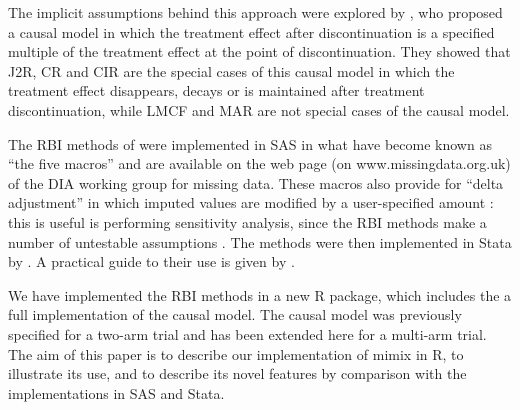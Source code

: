 The implicit assumptions behind this approach were explored by \citet{ian:RBIcausal}, who proposed a causal model in which the treatment effect after discontinuation is a specified multiple of the treatment effect at the point of discontinuation. They showed that J2R, CR and CIR are the special cases of this causal model in which the treatment effect disappears, decays or is maintained after treatment discontinuation, while LMCF and MAR are not special cases of the causal model. 

The RBI methods of \citet{Carpenter++13} were implemented in SAS in what have become known as ``the five macros'' and are available on the web page (on www.missingdata.org.uk) of the DIA working group for missing data. These macros also provide for ``delta adjustment'' in which imputed values are modified by a user-specified amount \citep{Ratitch++13}: this is useful is performing sensitivity analysis, since the RBI methods make a number of untestable assumptions \citep{ian:ZAMSTAR}.
The methods were then implemented in Stata by \citet{Cro++16}.
A practical guide to their use is given by \citet{Cro++20}.

We have implemented the RBI methods in a new R package, which includes the a full implementation of the causal model. 
The causal model was previously specified for a two-arm trial and has been extended here for a multi-arm trial.
The aim of this paper is to describe our implementation of mimix in R, to illustrate its use, and to describe its novel features by comparison with the implementations in SAS and Stata.

%
%

%
%

